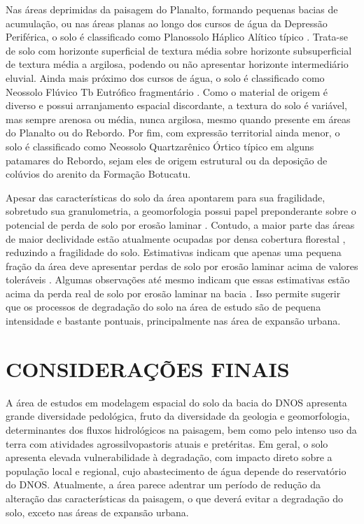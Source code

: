 Nas áreas deprimidas da paisagem do Planalto, formando pequenas bacias de acumulação, ou nas áreas planas ao 
longo dos cursos de água da Depressão Periférica, o solo é classificado como Planossolo Háplico Alítico típico 
\cite{Miguel2010}. Trata-se de solo com horizonte superficial de textura média sobre horizonte subsuperficial 
de textura média a argilosa, podendo ou não apresentar horizonte intermediário eluvial. Ainda mais próximo dos 
cursos de água, o solo é classificado como Neossolo Flúvico Tb Eutrófico fragmentário \cite{Miguel2010}. Como 
o material de origem é diverso e possui arranjamento espacial discordante, a textura do solo é variável, mas 
sempre arenosa ou média, nunca argilosa, mesmo quando presente em áreas do Planalto ou do Rebordo. Por fim, 
com expressão territorial ainda menor, o solo é classificado como Neossolo Quartzarênico Órtico típico em 
alguns patamares do Rebordo, sejam eles de origem estrutural ou da deposição de colúvios do arenito da 
Formação 
Botucatu.

Apesar das características do solo da área apontarem para sua fragilidade, sobretudo sua granulometria, a 
geomorfologia possui papel preponderante sobre o potencial de perda de solo por erosão laminar 
\cite{Miguel2010}. Contudo, a maior parte das áreas de maior declividade estão atualmente ocupadas por densa 
cobertura florestal \cite{SamuelRosaEtAl2011a}, reduzindo a fragilidade do solo. Estimativas indicam que 
apenas 
uma pequena fração da área deve apresentar perdas de solo por erosão laminar acima de valores toleráveis 
\cite{Miguel2010}. Algumas observações até mesmo indicam que essas estimativas estão acima da perda real de 
solo por erosão laminar na bacia \cite{Branco1998, MouraBueno2012}. Isso permite sugerir que os processos de 
degradação do solo na área de estudo são de pequena intensidade e bastante pontuais, principalmente nas área 
de expansão urbana.

\section{CONSIDERAÇÕES FINAIS}

A área de estudos em modelagem espacial do solo da bacia do DNOS apresenta grande diversidade pedológica, 
fruto da diversidade da geologia e geomorfologia, determinantes dos fluxos hidrológicos na paisagem, bem como 
pelo intenso uso da terra com atividades agrossilvopastoris atuais e pretéritas. Em geral, o solo apresenta 
elevada vulnerabilidade à degradação, com impacto direto sobre a população local e regional, cujo 
abastecimento de água depende do reservatório do DNOS. Atualmente, a área parece adentrar um período de 
redução 
da alteração das características da paisagem, o que deverá evitar a degradação do solo, exceto nas áreas de 
expansão urbana.

